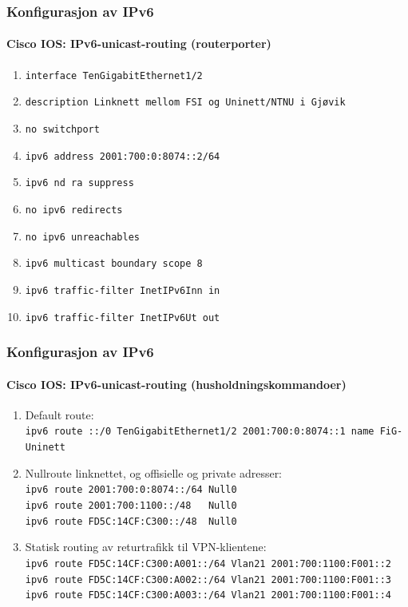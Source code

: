 \begin{frame}
  \frametitle{Konfigurasjon av IPv6}
  \framesubtitle{Cisco IOS: IPv6-unicast-routing (routerporter)}
  \begin{enumerate}
  \item \alert{\texttt{interface TenGigabitEthernet1/2}}
  \item \texttt{description Linknett mellom FSI og Uninett/NTNU i Gjøvik}
  \item \alert{\texttt{no switchport}}
  \item \alert{\texttt{ipv6 address 2001:700:0:8074::2/64}}
  \item \alert{\texttt{ipv6 nd ra suppress}}
  \item \alert{\texttt{no ipv6 redirects}}
  \item \alert{\texttt{no ipv6 unreachables}}
  \item \alert{\texttt{ipv6 multicast boundary scope 8}}
  \item \alert{\texttt{ipv6 traffic-filter InetIPv6Inn in}}
  \item \alert{\texttt{ipv6 traffic-filter InetIPv6Ut out}}
  \end{enumerate}
\end{frame}

\begin{frame}[fragile]
  \frametitle{Konfigurasjon av IPv6}
  \framesubtitle{Cisco IOS: IPv6-unicast-routing (husholdningskommandoer)}
  \begin{enumerate}
  \item Default route:\\
    \alert{\texttt{\small ipv6 route ::/0 TenGigabitEthernet1/2 2001:700:0:8074::1 name FiG-Uninett}}
  \item Nullroute linknettet, og offisielle og private adresser:\\
    \alert{\texttt{ipv6 route 2001:700:0:8074::/64 Null0}}\\
    \alert{\texttt{ipv6 route 2001:700:1100::/48\ \ \ Null0}}\\
    \alert{\texttt{ipv6 route FD5C:14CF:C300::/48\ \  Null0}}
  \item Statisk routing av returtrafikk til VPN-klientene:\\
    \alert{\texttt{ipv6 route FD5C:14CF:C300:A001::/64 Vlan21 2001:700:1100:F001::2}}\\
    \alert{\texttt{ipv6 route FD5C:14CF:C300:A002::/64 Vlan21 2001:700:1100:F001::3}}\\
    \alert{\texttt{ipv6 route FD5C:14CF:C300:A003::/64 Vlan21 2001:700:1100:F001::4}}
  \end{enumerate}
\end{frame}

